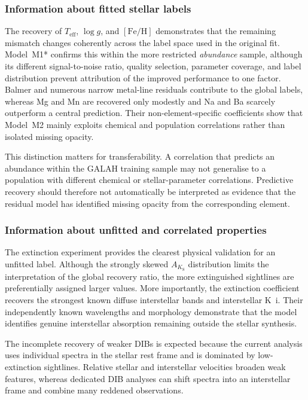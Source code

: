 \documentclass[twocolumn,apj,numberedappendix,appendixfloats]{openjournal}
\begin{document}
\subsubsection{Information about fitted stellar labels}

The recovery of $T_\mathrm{eff}$, $\log g$, and $[\mathrm{Fe/H}]$ demonstrates that the remaining mismatch changes coherently across the label space used in the original fit. Model~\textcolor{M1}{M1*} confirms this within the more restricted \textit{abundance} sample, although its different signal-to-noise ratio, quality selection, parameter coverage, and label distribution prevent attribution of the improved performance to one factor. Balmer and numerous narrow metal-line residuals contribute to the global labels, whereas Mg and Mn are recovered only modestly and Na and Ba scarcely outperform a central prediction. Their non-element-specific coefficients show that Model~\textcolor{M2}{M2} mainly exploits chemical and population correlations rather than isolated missing opacity.

This distinction matters for transferability. A correlation that predicts an abundance within the GALAH training sample may not generalise to a population with different chemical or stellar-parameter correlations. Predictive recovery should therefore not automatically be interpreted as evidence that the residual model has identified missing opacity from the corresponding element.

\subsubsection{Information about unfitted and correlated properties}

The extinction experiment provides the clearest physical validation for an unfitted label. Although the strongly skewed $A_{K_\mathrm{S}}$ distribution limits the interpretation of the global recovery ratio, the more extinguished sightlines are preferentially assigned larger values. More importantly, the extinction coefficient recovers the strongest known diffuse interstellar bands and interstellar K~{\sc i}. Their independently known wavelengths and morphology demonstrate that the model identifies genuine interstellar absorption remaining outside the stellar synthesis.

The incomplete recovery of weaker DIBs is expected because the current analysis uses individual spectra in the stellar rest frame and is dominated by low-extinction sightlines. Relative stellar and interstellar velocities broaden weak features, whereas dedicated DIB analyses \citep[e.g.][]{Vogrincic2023, Saydjari2023} can shift spectra into an interstellar frame and combine many reddened observations.
\end{document}
